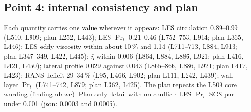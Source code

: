 \documentclass[10pt,a4paper]{article}
\newcommand*{\etab}{\bar\eta}
\begin{document}
\subsection*{Point 4: internal consistency and plan}
Each quantity carries one value wherever it appears: LES circulation 0.89--0.99 (L510, L909; plan L252, L443); LES
$\Pr_t$ 0.21--0.46 (L752--753, L914; plan L365, L446); LES eddy viscosity within about 10\,\% and 1.14 (L711--713,
L884, L913; plan L347--349, L422, L445); $\etab$ within 0.006 (L864, L884, L886, L921; plan L416, L421, L450); lateral
profile 0.029 against 0.043 (L865--866, L886, L921; plan L417, L423); RANS deficit 29--34\,\% (L95, L466, L902; plan
L111, L242, L439); wall-layer $\Pr_t$ (L741--742, L879; plan L362, L425). The plan repeats the L509 core wording
(finding above). Plan-only detail with no conflict: LES $\Pr_t$ SGS part under 0.001 (json: 0.0003 and 0.0005).

\clearpage
\appendix
\end{document}
